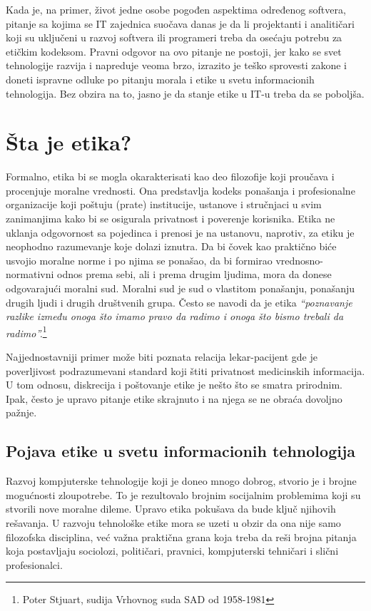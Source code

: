 \documentclass[a4paper]{article}
\begin{document}
{Kada je, na primer, život jedne osobe pogođen aspektima određenog softvera, pitanje sa kojima se IT zajednica suočava danas je da li projektanti i analitičari koji su uključeni u razvoj softvera ili programeri treba da osećaju potrebu za etičkim kodeksom.
Pravni odgovor na ovo pitanje ne postoji, jer kako se svet tehnologije razvija i napreduje veoma brzo, izrazito je teško sprovesti zakone i doneti ispravne odluke po pitanju morala i etike u svetu informacionih tehnologija. Bez obzira na to, jasno je da stanje etike u IT-u treba da se poboljša.

\section{Šta je etika?}

Formalno, etika bi se mogla okarakterisati kao deo filozofije koji pro\-u\-ča\-va i procenjuje moralne vrednosti. Ona predstavlja kodeks ponašanja i profesionalne organizacije koji poštuju (prate) institucije, ustanove i stručnjaci u svim zanimanjima kako bi se osigurala privatnost i poverenje korisnika. Etika ne uklanja odgovornost sa pojedinca i prenosi je na ustanovu, naprotiv, za etiku je neophodno razumevanje koje dolazi iznutra. Da bi čovek kao praktično biće usvojio moralne norme i po njima se ponašao, da bi formirao vrednosno-normativni odnos prema sebi, ali i prema drugim ljudima, mora da donese odgovarajući moralni sud. Moralni sud je sud o vlastitom ponašanju, ponašanju drugih ljudi i drugih društvenih grupa.\cite{Tavani}\cite{Illinois}
Često se navodi da je etika \emph{“poznavanje razlike između onoga što imamo pravo da radimo i onoga što bismo trebali da radimo”.}\footnote{Poter Stjuart, sudija Vrhovnog suda SAD od 1958-1981}

Najjednostavniji primer može biti poznata relacija lekar-pacijent gde je poverljivost podrazumevani standard koji štiti privatnost medicinskih informacija. U tom odnosu, diskrecija i poštovanje etike je nešto što se smatra prirodnim. Ipak, često je upravo pitanje etike skrajnuto i na njega se ne obraća dovoljno pažnje.

\subsection{Pojava etike u svetu informacionih tehnologija}

Razvoj kompjuterske tehnologije koji je doneo mnogo dobrog, stvorio je i brojne mogućnosti zloupotrebe. To je rezultovalo brojnim socijalnim problemima koji su stvorili nove moralne dileme. Upravo  etika pokušava da bude ključ njihovih rešavanja. U razvoju tehnološke etike mora se uzeti u obzir da ona nije samo filozofska disciplina, već važna praktična grana koja treba da reši brojna pitanja koja postavljaju sociolozi, političari, pravnici, kompjuterski tehničari i slični profesionalci\cite{Illinois}.

}
\end{document}
